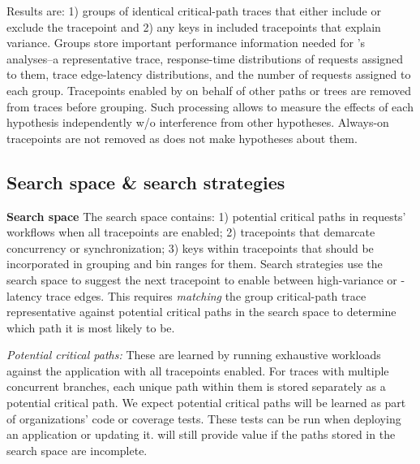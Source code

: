 Results are: 1) groups of identical critical-path
traces that either include or exclude the tracepoint and 2) any keys
in included tracepoints that explain variance.  Groups store important
performance information needed for \STAIF{}'s analyses--a
representative trace, response-time distributions of requests assigned
to them, trace edge-latency distributions, and the number of requests
assigned to each group.  Tracepoints enabled by \STAIF{} on behalf of
other paths or trees are removed from traces before grouping.  Such
processing allows \STAIF{} to measure the effects of each hypothesis
independently w/o interference from other hypotheses.  Always-on
tracepoints are not removed as \STAIF{} does not make hypotheses about
them.


\subsection{Search space \& search strategies}
\label{sec:design:search_strategies}

\noindent\textbf{Search space} The search space contains: 1) potential
critical paths in requests' workflows when all tracepoints are
enabled; 2) tracepoints that demarcate concurrency or
synchronization; 3) keys within tracepoints that should be
incorporated in grouping and bin ranges for them. %
Search strategies use the search space to suggest the next tracepoint to
enable between high-variance or -latency trace edges.  %
This requires \textit{matching} the group
critical-path trace representative against potential critical paths in
the search space to determine which path it is most likely to be.

\textit{Potential critical paths:} These are learned by
running exhaustive workloads against the application with all
tracepoints enabled. For traces with multiple
concurrent branches, each unique path within them is stored separately as a
potential critical path. We expect potential critical paths will be
learned as part of organizations' code or coverage tests.  These tests
can be run when deploying an application or updating it.  
\STAIF{} will still provide value if the paths stored in the
search space are incomplete.

